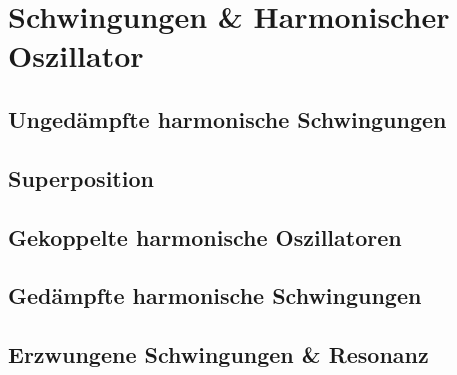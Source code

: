 \section{Schwingungen \& Harmonischer Oszillator}%
\label{schwing:sec:schwingungen_harmonischer_oszillator}

\subsection{Ungedämpfte harmonische Schwingungen}%
\label{schwing:sub:ungedaempfte_harmonische_schwingungen}

\subsection{Superposition}%
\label{schwing:sub:superposition}

\subsection{Gekoppelte harmonische Oszillatoren}%
\label{schwing:sub:gekoppelte_harmonische_oszillatoren}

\subsection{Gedämpfte harmonische Schwingungen}%
\label{schwing:sub:gedaempfte_harmonische_schwingungen}

\subsection{Erzwungene Schwingungen \& Resonanz}%
\label{schwing:sub:erzwungene_schwingungen_resonanz}
